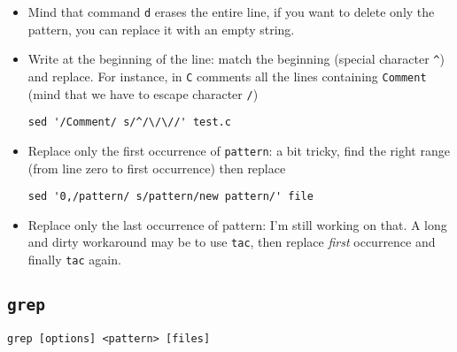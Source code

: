 \documentclass[a4paper,12pt,%
              final%
              ]{article}
\begin{document}
\begin{itemize}
  \item Mind that command \verb|d| erases the entire line, if you want to delete only the pattern, you can replace it with an empty string.
  \item Write at the beginning of the line: match the beginning (special character \verb|^|) and replace. For instance, in \texttt{C} comments all the lines containing \texttt{Comment} (mind that we have to escape character \verb|/|)
\begin{verbatim}
sed '/Comment/ s/^/\/\//' test.c
\end{verbatim}
  \item Replace only the first occurrence of \verb|pattern|: a bit tricky, find the right range (from line zero to first occurrence) then replace
\begin{verbatim}
sed '0,/pattern/ s/pattern/new pattern/' file
\end{verbatim}
  \item Replace only the last occurrence of pattern: I'm still working on that. A long and dirty workaround may be to use \verb|tac|, then replace \emph{first} occurrence and finally \verb|tac| again.
\end{itemize}

\subsection{\texttt{grep}}
\label{ssec:grep}
\verb|grep [options] <pattern> [files]|
\end{document}
